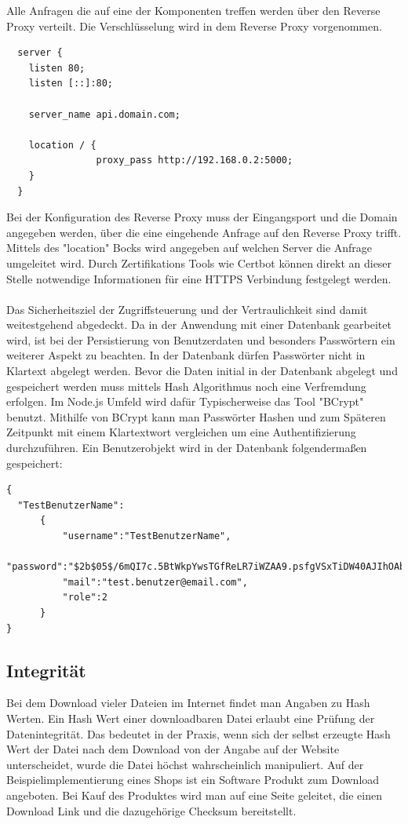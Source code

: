 \documentclass[utf8,biblatex]{lni}
\begin{document}
Alle Anfragen die auf eine der Komponenten treffen werden über den Reverse Proxy verteilt. Die Verschlüsselung wird 
in dem Reverse Proxy vorgenommen. 

\begin{verbatim}
  server {
    listen 80;
    listen [::]:80;

    server_name api.domain.com;

    location / {
                proxy_pass http://192.168.0.2:5000;
    }
  }
\end{verbatim}

Bei der Konfiguration des Reverse Proxy muss der Eingangsport und die Domain angegeben werden, über die eine eingehende Anfrage auf den Reverse Proxy trifft. 
Mittels des "location" Bocks wird angegeben auf welchen Server die Anfrage umgeleitet wird. 
Durch Zertifikations Tools wie Certbot können direkt an dieser Stelle notwendige Informationen für eine HTTPS Verbindung festgelegt werden. 
\\\\
Das Sicherheitsziel der Zugriffsteuerung und der Vertraulichkeit sind damit weitestgehend abgedeckt. 
Da in der Anwendung mit einer Datenbank gearbeitet wird, ist bei der Persistierung von Benutzerdaten und besonders Passwörtern ein weiterer Aspekt zu beachten. 
In der Datenbank dürfen Passwörter nicht in Klartext abgelegt werden. 
Bevor die Daten initial in der Datenbank abgelegt und gespeichert werden muss mittels Hash Algorithmus noch eine Verfremdung erfolgen. 
Im Node.js Umfeld wird dafür Typischerweise das Tool "BCrypt" benutzt. Mithilfe von BCrypt kann man Passwörter Hashen und zum Späteren Zeitpunkt 
mit einem Klartextwort vergleichen um eine Authentifizierung durchzuführen. 
Ein Benutzerobjekt wird in der Datenbank folgendermaßen gespeichert: 

\begin{verbatim}
{
  "TestBenutzerName":
      {
          "username":"TestBenutzerName",
          "password":"$2b$05$/6mQI7c.5BtWkpYwsTGfReLR7iWZAA9.psfgVSxTiDW40AJIhOAbS",
          "mail":"test.benutzer@email.com",
          "role":2
      }
}
\end{verbatim}



\subsection{Integrität}

Bei dem Download vieler Dateien im Internet findet man Angaben zu Hash Werten. 
Ein Hash Wert einer downloadbaren Datei erlaubt eine Prüfung der Datenintegrität. 
Das bedeutet in der Praxis, wenn sich der selbst erzeugte Hash Wert der Datei nach dem Download 
von der Angabe auf der Website unterscheidet, wurde die Datei höchst wahrscheinlich manipuliert. 
Auf der Beispielimplementierung eines Shops ist ein Software Produkt zum Download angeboten. 
Bei Kauf des Produktes wird man auf eine Seite geleitet, die einen Download Link und die 
dazugehörige Checksum bereitstellt. 
\end{document}
